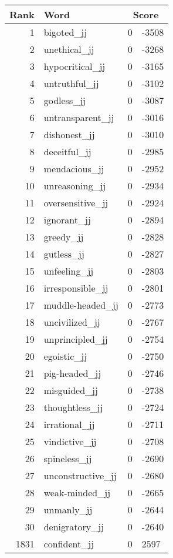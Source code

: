 \begin{longtable}[!htbp]{| rlr@{.}l |}
    \hline
    \textbf{Rank} & \textbf{Word} & \multicolumn{2}{c|}{\textbf{Score}} \\
    \hline
    \endhead
    1 & bigoted\_jj & 0 & -3508 \\
    2 & unethical\_jj & 0 & -3268 \\
    3 & hypocritical\_jj & 0 & -3165 \\
    4 & untruthful\_jj & 0 & -3102 \\
    5 & godless\_jj & 0 & -3087 \\
    6 & untransparent\_jj & 0 & -3016 \\
    7 & dishonest\_jj & 0 & -3010 \\
    8 & deceitful\_jj & 0 & -2985 \\
    9 & mendacious\_jj & 0 & -2952 \\
    10 & unreasoning\_jj & 0 & -2934 \\
    11 & oversensitive\_jj & 0 & -2924 \\
    12 & ignorant\_jj & 0 & -2894 \\
    13 & greedy\_jj & 0 & -2828 \\
    14 & gutless\_jj & 0 & -2827 \\
    15 & unfeeling\_jj & 0 & -2803 \\
    16 & irresponsible\_jj & 0 & -2801 \\
    17 & muddle-headed\_jj & 0 & -2773 \\
    18 & uncivilized\_jj & 0 & -2767 \\
    19 & unprincipled\_jj & 0 & -2754 \\
    20 & egoistic\_jj & 0 & -2750 \\
    21 & pig-headed\_jj & 0 & -2746 \\
    22 & misguided\_jj & 0 & -2738 \\
    23 & thoughtless\_jj & 0 & -2724 \\
    24 & irrational\_jj & 0 & -2711 \\
    25 & vindictive\_jj & 0 & -2708 \\
    26 & spineless\_jj & 0 & -2690 \\
    27 & unconstructive\_jj & 0 & -2680 \\
    28 & weak-minded\_jj & 0 & -2665 \\
    29 & unmanly\_jj & 0 & -2644 \\
    30 & denigratory\_jj & 0 & -2640 \\
    1831 & confident\_jj & 0 & 2597 \\

\end{longtable}
